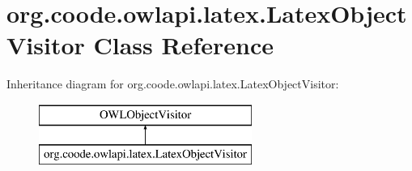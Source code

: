 \hypertarget{classorg_1_1coode_1_1owlapi_1_1latex_1_1_latex_object_visitor}{\section{org.\-coode.\-owlapi.\-latex.\-Latex\-Object\-Visitor Class Reference}
\label{classorg_1_1coode_1_1owlapi_1_1latex_1_1_latex_object_visitor}
}
Inheritance diagram for org.\-coode.\-owlapi.\-latex.\-Latex\-Object\-Visitor\-:\begin{figure}[H]
\begin{center}
\leavevmode
\includegraphics[height=2.000000cm]{classorg_1_1coode_1_1owlapi_1_1latex_1_1_latex_object_visitor}
\end{center}
\end{figure}
